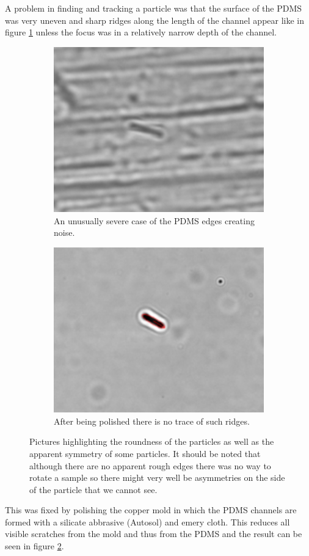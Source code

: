 A problem in finding and tracking a particle was that the surface of the PDMS was very uneven and sharp ridges along the length of the channel appear like in figure \ref{fig:unpolished} unless the focus was in a relatively narrow depth of the channel. 
 
 \begin{figure}[H]
 \centering
 \begin{subfigure}[3a]{0.40\textwidth}
 \includegraphics[width=\textwidth]{figures/improvements/unpolished.png}
 \caption{An unusually severe case of the PDMS edges creating noise.}\label{fig:unpolished}
 \end{subfigure}\hspace{1em}%
 \begin{subfigure}[3b]{0.40\textwidth}
 \includegraphics[width=\textwidth]{figures/improvements/polished.png}
 \caption{After being polished there is no trace of such ridges.}\label{fig:polished}
 \end{subfigure}
 \caption{Pictures highlighting the roundness of the particles as well as the apparent symmetry of some particles. It should be noted that although there are no apparent rough edges there was no way to rotate a sample so there might very well be asymmetries on the side of the particle that we cannot see.}
 \label{fig:polisheffect}
 \end{figure}
 

This was fixed by polishing the copper mold in which the PDMS channels are formed with a silicate abbrasive (Autosol) and emery cloth. This reduces all visible scratches from the mold and thus from the PDMS and the result can be seen in figure \ref{fig:polished}.

